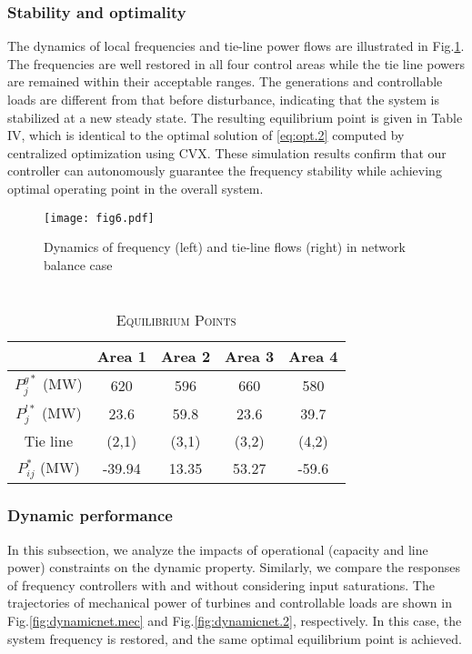 \subsubsection {Stability and optimality}
The dynamics of local frequencies  and tie-line power flows are illustrated in  Fig.\ref{fig:stabnet}. The frequencies are well restored in all four control areas while the tie line powers are remained within their acceptable ranges. The generations and controllable loads are different from that before disturbance, indicating that the system is stabilized at a new steady state. The resulting equilibrium point is  given in Table IV, which is identical to the optimal solution of  \eqref{eq:opt.2} computed by centralized optimization using CVX. These simulation results confirm that our controller can autonomously guarantee the frequency stability while achieving optimal operating point in the overall system. 

\begin{figure}[htp]
	\centering
	\texttt{[image: fig6.pdf]}
	\caption{Dynamics of frequency (left) and tie-line flows (right) in network balance case}
	\label{fig:stabnet}
\end{figure}

\begin{table}[htb]
	\centering
	\caption{\\ \textsc {Equilibrium Points}}
	\label{tab:eps}
	\begin{tabular}{c c c c c}
		\hline 
		& Area 1 & Area 2 & Area 3& Area 4\\
		\hline
		$P^{g*}_j$ (MW)  & 620  & 596  & 660  & 580\\
		$P^{l*}_j$ (MW)  & 23.6 & 59.8 & 23.6 & 39.7\\
		\hline
		\hline
		Tie line      & (2,1) & (3,1) & (3,2) & (4,2)\\
		\hline
		$P_{ij}^*$ (MW) & -39.94 & 13.35 & 53.27 & -59.6\\
		\hline
	\end{tabular}
\end{table}

\subsubsection{Dynamic performance}
In this subsection, we analyze the impacts of operational (capacity and  line power) constraints on the dynamic property. Similarly, we compare the  responses of  frequency controllers with and without considering input saturations. The trajectories of mechanical power of turbines and controllable loads are shown in Fig.\ref{fig:dynamicnet.mec} and Fig.\ref{fig:dynamicnet.2}, respectively. In this case, the system frequency is restored, and the same optimal equilibrium point is achieved. 

